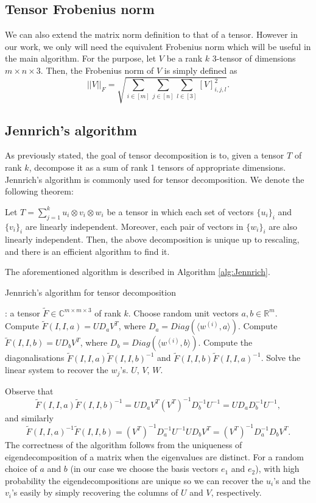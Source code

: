 \subsection{Tensor Frobenius norm}
We can also extend the matrix norm definition to that of a tensor. However in our work, we only will need the equivalent Frobenius norm which will be useful in the main algorithm. For the purpose, let $V$ be a rank $k$ 3-tensor of dimensions $m\times n\times 3$. Then, the Frobenius norm of $V$ is simply defined as 
\begin{equation}
    ||V||_F=\sqrt{\sum_{i\in[m]}\sum_{j\in[n]}\sum_{l\in[3]}[V]_{i,j,l}^2}.
\end{equation}
\subsection{Jennrich's algorithm}
As previously stated, the goal of tensor decomposition is to, given a tensor $T$ of rank $k$, decompose it as a sum of rank 1 tensors of appropriate dimensions. Jennrich's algorithm is commonly used for tensor decomposition. We denote the following theorem:
\begin{theorem}
    Let $T=\sum_{j=1}^k u_i\otimes v_i\otimes w_i$ be a tensor in which each set of vectors $\{u_i\}_i$ and $\{v_i\}_i$ are linearly independent. Moreover, each pair of vectors in $\{w_i\}_i$ are also linearly independent. Then, the above decomposition is unique up to rescaling, and there is an efficient algorithm to find it.
\end{theorem}
The aforementioned algorithm is described in Algorithm \ref{alg:Jennrich}.
\begin{algorithm}
    \caption{Jennrich's algorithm for tensor decomposition}
    \label{alg:Jennrich}
    \begin{algorithmic}
        : a tensor $\tilde{F}\in\mathbb{C}^{m\times m\times 3}$ of rank $k$.
        \State Choose random unit vectors $a,b\in\mathbb{R}^m$.
        \State Compute $\tilde{F}(I,I,a)=UD_aV^T$, where $D_a=Diag(\langle w^{(i)},a\rangle)$.
        \State Compute $\tilde{F}(I,I,b)=UD_bV^T$, where $D_b=Diag(\langle w^{(i)},b\rangle)$.
        \State Compute the diagonalisations $\tilde{F}(I,I,a)\tilde{F}(I,I,b)^{-1}$ and $\tilde{F}(I,I,b)\tilde{F}(I,I,a)^{-1}$.
        \State Solve the linear system to recover the $w_j$'s.
         $U$, $V$, $W$.
    \end{algorithmic}
\end{algorithm}
Observe that $$\tilde{F}(I,I,a)\tilde{F}(I,I,b)^{-1}=UD_aV^T(V^T)^{-1}D_b^{-1}U^{-1}=UD_aD_b^{-1}U^{-1},$$ and similarly $$\tilde{F}(I,I,a)^{-1}\tilde{F}(I,I,b)=(V^T)^{-1}D_a^{-1}U^{-1}UD_bV^T=(V^T)^{-1}D_a^{-1}D_bV^T.$$ The correctness of the algorithm follows from the uniqueness of eigendecomposition of a matrix when the eigenvalues are distinct. For a random choice of $a$ and $b$ (in our case we choose the basis vectors $e_1$ and $e_2$), with high probability the eigendecompositions are unique so we can recover the $u_i$'s and the $v_i$'s easily by simply recovering the columns of $U$ and $V$, respectively.